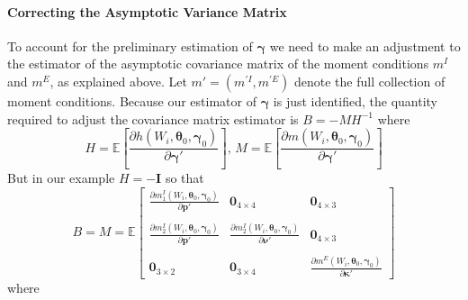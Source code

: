 \documentclass[12pt]{article}
\begin{document}
\paragraph{Correcting the Asymptotic Variance Matrix}
To account for the preliminary estimation of $\boldsymbol{\gamma}$ we need to make an adjustment to the estimator of the asymptotic covariance matrix of the moment conditions $m^I$ and $m^E$, as explained above.
Let $m' = (m^{'I}, m^{'E})$ denote the full collection of moment conditions.
Because our estimator of $\boldsymbol{\gamma}$ is just identified, the quantity required to adjust the covariance matrix estimator is $B = -MH^{-1}$ where 
\[
  H = \mathbb{E}\left[ \frac{\partial h(W_i, \boldsymbol{\theta}_0, \boldsymbol{\gamma}_0)}{\partial \boldsymbol{\gamma}'} \right], \,
  M = \mathbb{E}\left[ \frac{\partial m(W_i, \boldsymbol{\theta}_0, \boldsymbol{\gamma}_0)}{\partial \boldsymbol{\gamma}'} \right]  
\]
But in our example $H = -\mathbf{I}$ so that 
\[
  B = M = \mathbb{E}\left[
\begin{array}{ccc}
  \displaystyle \frac{\partial m_1^I(W_i, \boldsymbol{\theta}_0, \boldsymbol{\gamma}_0)}{\partial \mathbf{p}'} & \mathbf{0}_{4\times 4} & \mathbf{0}_{4 \times 3}\\ \\
  \displaystyle \frac{\partial m^I_2(W_i, \boldsymbol{\theta}_0, \boldsymbol{\gamma}_0)}{\partial \mathbf{p}'} &
\displaystyle \frac{\partial m^I_2(W_i, \boldsymbol{\theta}_0, \boldsymbol{\gamma}_0)}{\partial \boldsymbol{\nu}'} &
\mathbf{0}_{4\times 3} \\ \\
\mathbf{0}_{3 \times 2} & \mathbf{0}_{3\times 4} & 
\displaystyle \frac{\partial m^E\left( W_i, \boldsymbol{\theta}_0, \boldsymbol{\gamma}_0 \right)}{\partial \boldsymbol{\kappa}'}
\end{array}
\right]
\]
where 
\end{document}

